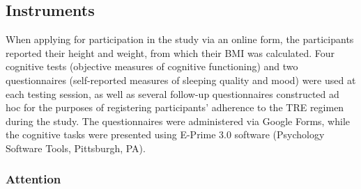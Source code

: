 \documentclass[authordate, empirical,issue]{jote-new-article}
\begin{document}
\subsection{Instruments }



When applying for participation in the study via an online form, the participants reported their height and weight, from which their BMI was calculated. Four cognitive tests (objective measures of cognitive functioning) and two questionnaires (self-reported measures of sleeping quality and mood) were used at each testing session, as well as several follow-up questionnaires constructed ad hoc for the purposes of registering participants' adherence to the TRE regimen during the study. The questionnaires were administered via Google Forms, while the cognitive tasks were presented using E-Prime 3.0 software (Psychology Software Tools, Pittsburgh, PA).



\subsubsection{Attention}
\end{document}
